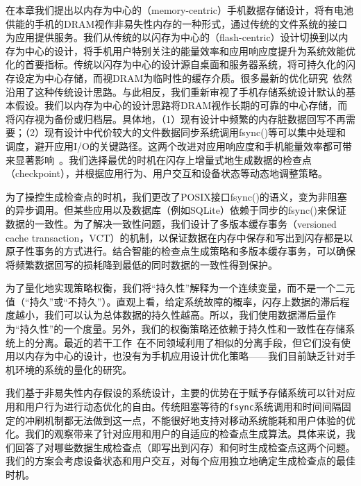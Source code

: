 在本章我们提出以内存为中心的（memory-centric）手机数据存储设计，将有电池供能的手机的DRAM视作非易失性内存的一种形式，通过传统的文件系统的接口为应用提供服务。我们从传统的以闪存为中心的（flash-centric）设计切换到以内存为中心的设计，将手机用户特别关注的能量效率和应用响应度提升为系统效能优化的首要指标。传统以闪存为中心的设计源自桌面和服务器系统，将可持久化的闪存设定为中心存储，而视DRAM为临时性的缓存介质。很多最新的优化研究~\cite{Jeong:2013:ISO:2535461.2535499, 6558430, Kim:2014:RJJ:2591305.2591332,
Nguyen:2014:ISR:2638728.2638841, Nguyen:2014:SAL:2638728.2638763,
Nguyen:2013:SSE:2493432.2493505, 6986137}依然沿用了这种传统设计思路。与此相反，我们重新审视了手机存储系统设计默认的基本假设。我们以内存为中心的设计思路将DRAM视作长期的可靠的中心存储，而将闪存视为备份或归档层。具体地，（1）现有设计中频繁的内存脏数据回写不再需要；（2）现有设计中代价较大的文件数据同步系统调用fsync()等可以集中处理和调度，避开应用I/O的关键路径。这两个改进对应用响应度和手机能量效率都可带来显著影响~\cite{Desnoyers:2013:SRN:2534861.2534867,Kim:RSS:2012, Lee:2012:SLD:2380356.2380367,Nguyen:2014:ISR:2638728.2638841}。我们选择最优的时机在闪存上增量式地生成数据的检查点（checkpoint），并根据应用行为、用户交互和设备状态等动态地调整策略。

为了操控生成检查点的时机，我们更改了POSIX接口fsync()的语义，变为非阻塞的异步调用。但某些应用以及数据库（例如SQLite）依赖于同步的fsync()来保证数据的一致性。为了解决一致性问题，我们设计了多版本缓存事务（versioned cache transaction，VCT）的机制，以保证数据在内存中保存和写出到闪存都是以原子性事务的方式进行。结合智能的检查点生成策略和多版本缓存事务，可以确保将频繁数据回写的损耗降到最低的同时数据的一致性得到保护。

为了量化地实现策略权衡，我们将“持久性”解释为一个连续变量，而不是一个二元值（“持久”或“不持久”）。直观上看，给定系统故障的概率，闪存上数据的滞后程度越小，我们可以认为总体数据的持久性越高。所以，我们使用数据滞后量作为“持久性”的一个度量。另外，我们的权衡策略还依赖于持久性和一致性在存储系统上的分离。最近的若干工作~\cite{Chidambaram:2013:OCC:2517349.2522726,
Mickens:2014:BFC:2616448.2616473}在不同领域利用了相似的分离手段，但它们没有使用以内存为中心的设计，也没有为手机应用设计优化策略——我们目前缺乏针对手机环境的系统的量化的研究。

我们基于非易失性内存假设的系统设计，主要的优势在于赋予存储系统可以针对应用和用户行为进行动态优化的自由。传统阻塞等待的\texttt{fsync}系统调用和时间间隔固定的冲刷机制都无法做到这一点，不能很好地支持对移动系统能耗和用户体验的优化。我们的观察带来了针对应用和用户的自适应的检查点生成算法。具体来说，我们回答了对哪些数据生成检查点（即写出到闪存）和何时生成检查点这两个问题。我们的方案会考虑设备状态和用户交互，对每个应用独立地确定生成检查点的最佳时机。

